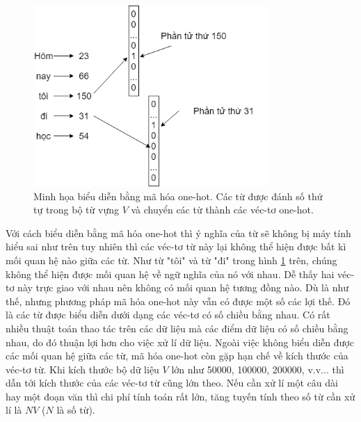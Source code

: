 \begin{figure}
	\centering
	\includegraphics[width=0.8\textwidth]{onehot-representation.png}
	\caption[Minh họa biểu diễn bằng mã hóa one-hot.]{Minh họa biểu diễn bằng mã hóa one-hot. Các từ được đánh số thứ tự trong bộ từ vựng $V$ và chuyển các từ thành các véc-tơ one-hot.}
	\label{fig_onehot-representation}
\end{figure}

Với cách biểu diễn bằng mã hóa one-hot thì ý nghĩa của từ sẽ không bị máy tính hiểu sai như trên tuy nhiên thì các véc-tơ từ này lại không thể hiện được bất kì mối quan hệ nào giữa các từ. Như từ "tôi" và từ "đi" trong hình \ref{fig_onehot-representation} trên, chúng không thể hiện được mối quan hệ về ngữ nghĩa của nó với nhau. Dễ thấy hai véc-tơ này trực giao với nhau nên không có mối quan hệ tương đồng nào. Dù là như thế, nhưng phương pháp mã hóa one-hot này vẫn có được một số các lợi thế. Đó là các từ được biểu diễn dưới dạng các véc-tơ có số chiều bằng nhau. Có rất nhiều thuật toán thao tác trên các dữ liệu mà các điểm dữ liệu có số chiều bằng nhau, do đó thuận lợi hơn cho việc xử lí dữ liệu. Ngoài việc không biểu diễn được các mối quan hệ giữa các từ, mã hóa one-hot còn gặp hạn chế về kích thước của véc-tơ từ. Khi kích thước bộ dữ liệu $V$ lớn như 50000, 100000, 200000, v.v... thì dẫn tới kích thước của các véc-tơ từ cũng lớn theo. Nếu cần xử lí một câu dài hay một đoạn văn thì chi phí tính toán rất lớn, tăng tuyến tính theo số từ cần xử lí là $NV$ ($N$ là số từ).

